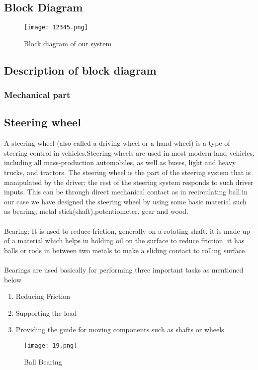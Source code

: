 \documentclass[12pt,a4paper]{article}
\begin{document}
\begin{center}
\begin{center}
\subsection{Block Diagram}
\begin{figure}[H]
	\centering 
	\texttt{[image: 12345.png]}
	\caption{Block diagram of our system}
	
\end{figure}
\subsection{Description of block diagram}
\subsubsection{Mechanical part}
\subsection*{Steering wheel}
A steering wheel (also called a driving wheel or a hand wheel) is a type of steering control in vehicles.Steering wheels are used in most modern land vehicles, including all mass-production automobiles, as well as buses, light and heavy trucks, and tractors. The steering wheel is the part of the steering system that is manipulated by the driver; the rest of the steering system responds to such driver inputs. This can be through direct mechanical contact as in recirculating ball.in our case we have designed the steering wheel by using some basic material such as bearing, metal stick(shaft),potentiometer, gear and wood.\\
\\
Bearing: It is  used to reduce friction, generally on a rotating shaft. it is made up of a material which helps in holding oil on the surface to reduce friction. it has balls or rods in between two metals to make a sliding contact to rolling surface.\\
\\
Bearings are used basically for performing three important tasks as mentioned below

\begin{enumerate}
	\item Reducing Friction
	\item Supporting the load
	\item Providing the guide for moving components such as shafts or wheels
	
\end{enumerate}
\begin{figure}[H]
	\centering 
	\texttt{[image: 19.png]}
	\caption{Ball Bearing}
	

\end{figure}
\end{center}
\end{center}
\end{document}
